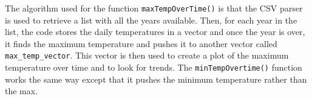 The algorithm used for the function \texttt{maxTempOverTime()} is that the CSV parser is used to retrieve a list with all the years available. Then, for each year in the list, the code stores the daily temperatures in a vector and once the year is over, it finds the maximum temperature and pushes it to another vector called \texttt{max\_temp\_vector}. This vector is then used to create a plot of the maximum temperature over time and to look for trends. The \texttt{minTempOvertime()} function works the same way except that it pushes the minimum temperature rather than the max. 